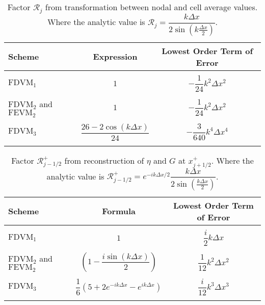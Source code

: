 \begin{table}
	\centering
	\begin{tabular}{l  c  c}
		Scheme& Expression& Lowest Order Term of Error \\
		\hline && \\
		$\text{FDVM}_1$ & $1$ & $-\dfrac{1}{24}k^2 \Delta x^2$ \\ & & \\
		$\text{FDVM}_2$ and $\text{FEVM}_2$& $1$ & $-\dfrac{1}{24}k^2 \Delta x^2$ \\ & & \\
		$\text{FDVM}_3$& $\dfrac{26 - 2 \cos\left(k \Delta x\right)}{24}$ & $-\dfrac{3}{640}k^4 \Delta x^4$ \\ & & \\
	\end{tabular}
	\caption{Factor $\mathcal{R}_j$ from transformation between nodal and cell average values. Where the analytic value is $\mathcal{R}_j = \dfrac{k\Delta x}{2 \sin \left(k\frac{\Delta x}{2}\right)  }$.}
	\label{tab:Mfactor}
\end{table}
\begin{table}
	\centering
	\begin{tabular}{l  c  c}
		Scheme& Formula& Lowest Order Term of Error\\
		\hline && \\
		$\text{FDVM}_1$ & $1$ & $\dfrac{i}{2}k \Delta x$ \\ & & \\
		$\text{FDVM}_2$ and $\text{FEVM}_2$& $ \left(1 - \dfrac{i \sin\left(k\Delta x \right)}{2} \right)$ & $\dfrac{1}{12}k^2 \Delta x^2$ \\ & & \\
		$\text{FDVM}_3$& $\dfrac{1}{6}\left({5 + 2e^{-i k {\Delta x}} - e^{i k {\Delta x}}} \right)$ & $\dfrac{i}{12}k^3 \Delta x^3$ \\ & & \\
	\end{tabular}
	\caption{Factor $\mathcal{R}^+_{j-1/2}$ from reconstruction of $\eta$ and $G$ at $x^+_{j+1/2}$. Where the analytic value is $\mathcal{R}^+_{j-1/2} =e^{-i k \Delta x/2}\dfrac{k\Delta x}{2 \sin\left(\frac{k \Delta x}{2}\right)}$. }
	\label{tab:Rpfactor}
\end{table}


